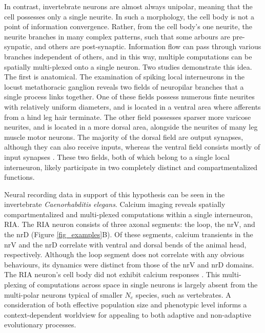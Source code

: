 \documentclass[twocolumn]{article}
\begin{document}
In contrast, invertebrate neurons are almost always unipolar, meaning that the cell possesses only a single neurite. In such a morphology, the cell body is not a point of information convergence. Rather, from the cell body's one neurite, the neurite branches in many complex patterns, such that some arbours are pre-synpatic, and others are post-synaptic. Information flow can pass through various branches independent of others, and in this way, multiple computations can be spatially multi-plexed onto a single neuron. Two studies demonstrate this idea. The first is anatomical. The examination of spiking local interneurons in the locust metathoracic ganglion reveals two fields of neuropilar branches that a single process links together. One of these fields possess numerous finte neurites with relatively uniform diameters, and is located in a ventral area where afferents from a hind leg hair terminate. The other field possesses sparser more varicose neurites, and is located in a more dorsal area, alongside the neurites of many leg muscle motor neurons. The majority of the dorsal field are output synapses, although they can also receive inputs, whereas the ventral field consists mostly of input synapses \cite{watson_burrows_1985}. These two fields, both of which belong to a single local interneuron, likely participate in two completely distinct and compartmentalized functions. 

Neural recording data in support of this hypothesis can be seen in the invertebrate \textit{Caenorhabditis  elegans}. Calcium imaging reveals spatially compartmentalized and multi-plexed computations within a single interneuron, RIA. The RIA neuron consists of three axonal segments: the loop, the nrV, and the nrD (Figure \ref{fig_examples}B). Of these segments, calcium transients in the nrV and the nrD correlate with ventral and dorsal bends of the animal head, respectively. Although the loop segment does not correlate with any obvious behaviours, its dynamics were distinct from those of the nrV and nrD domains. The RIA neuron's cell body did not exhibit calcium responses \cite{Hendricks_Ha_Maffey_Zhang_2012}. This multi-plexing of computations across space in single neurons is largely absent from the multi-polar neurons typical of smaller $N_e$ species, such as vertebrates. A consideration of both effective population size and phenotypic level informs a context-dependent worldview for appealing to both adaptive and non-adaptive evolutionary processes. 
\end{document}
